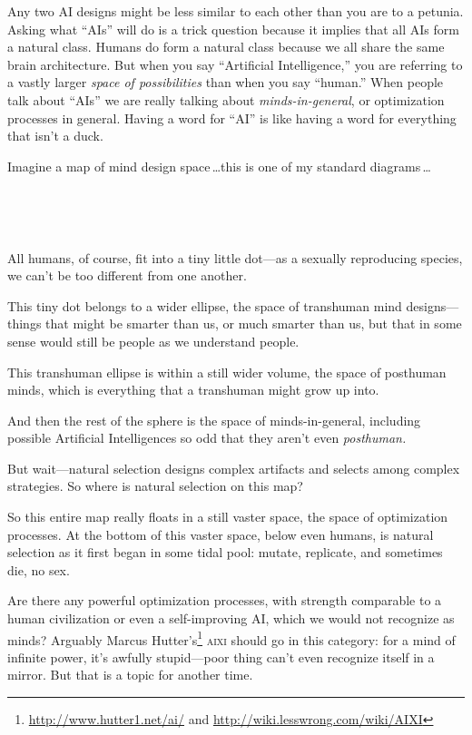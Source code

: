  Any two AI designs might be less similar to each other than you
are to a petunia. Asking what
``AIs'' will do is a trick question
because it implies that all AIs form a natural class. Humans do form a
natural class because we all share the same brain architecture. But
when you say ``Artificial
Intelligence,'' you are referring to a vastly larger
\textit{space of possibilities} than when you say
``human.'' When people talk about
``AIs'' we are really talking about
\textit{minds-in-general}, or optimization processes in general. Having
a word for ``AI'' is like having a
word for everything that isn't a duck.


 Imagine a map of mind design space\,\ldots this is one of my
standard diagrams\,\ldots


 ~

{\centering
{}

\par}


\bigskip


 ~


 All humans, of course, fit into a tiny little dot---as a sexually
reproducing species, we can't be too different from one
another.


 This tiny dot belongs to a wider ellipse, the space of transhuman
mind designs---things that might be smarter than us, or much smarter
than us, but that in some sense would still be people as we understand
people.


 This transhuman ellipse is within a still wider volume, the space
of posthuman minds, which is everything that a transhuman might grow up
into.


 And then the rest of the sphere is the space of minds-in-general,
including possible Artificial Intelligences so odd that they
aren't even \textit{posthuman.}


 But wait---natural selection designs complex artifacts and selects
among complex strategies. So where is natural selection on this map?


 So this entire map really floats in a still vaster space, the
space of optimization processes. At the bottom of this vaster space,
below even humans, is natural selection as it first began in some tidal
pool: mutate, replicate, and sometimes die, no sex.


 Are there any powerful optimization processes, with strength
comparable to a human civilization or even a self-improving AI, which
we would not recognize as minds? Arguably Marcus
Hutter's\footnote{\url{http://www.hutter1.net/ai/} and \url{http://wiki.lesswrong.com/wiki/AIXI}} \textsc{aixi} should go in this category: for a mind of
infinite power, it's awfully stupid---poor thing
can't even recognize itself in a mirror. But that is a
topic for another time.

